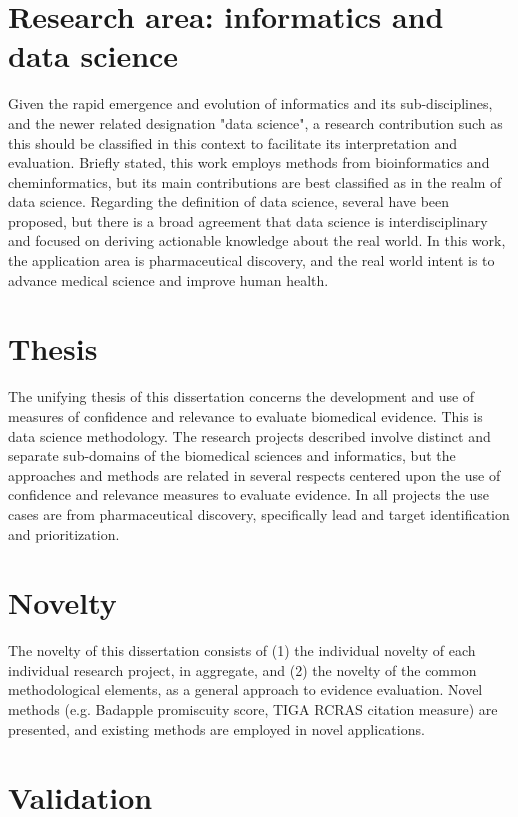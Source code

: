 \section{Research area: informatics and data science}

Given the rapid emergence and evolution of informatics and its sub-disciplines, and the newer related designation "data science", a research contribution such as this should be classified in this context to facilitate its interpretation and evaluation. Briefly stated, this work employs methods from bioinformatics and cheminformatics, but its main contributions are best classified as in the realm of data science. Regarding the definition of data science, several have been proposed\cite{ONeil2013-je,Peng2016-gq}, but there is a broad agreement that data science is interdisciplinary and focused on deriving actionable knowledge about the real world. In this work, the application area is pharmaceutical discovery, and the real world intent is to advance medical science and improve human health.

\section{Thesis}

The unifying thesis of this dissertation concerns the development and use of measures of confidence and relevance to evaluate biomedical evidence. This is data science methodology. The research projects described involve distinct and separate sub-domains of the biomedical sciences and informatics, but the approaches and methods are related in several respects centered upon the use of confidence and relevance measures to evaluate evidence. In all projects the use cases are from pharmaceutical discovery, specifically lead and target identification and prioritization.  

\section{Novelty}

The novelty of this dissertation consists of (1) the individual novelty of each individual research project, in aggregate, and (2) the novelty of the common methodological elements, as a general approach to evidence evaluation. Novel methods (e.g. Badapple promiscuity score, TIGA RCRAS citation measure) are presented, and existing methods are employed in novel applications.

\section{Validation}

